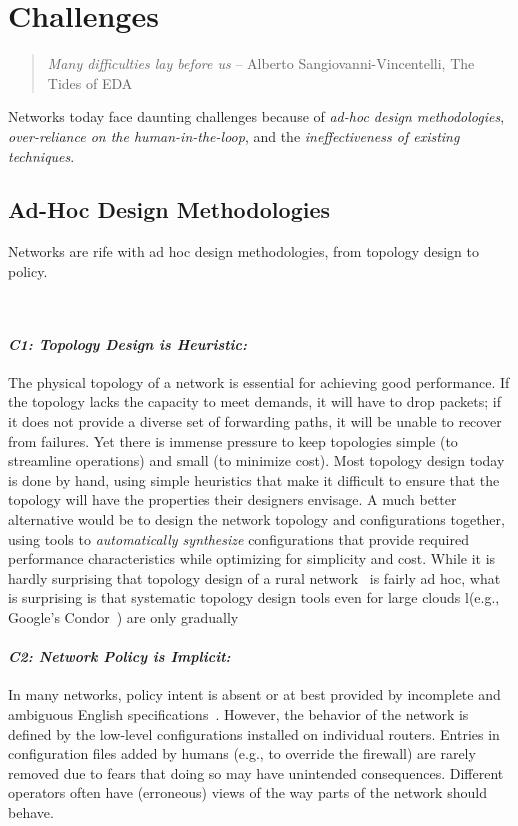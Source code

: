 \section{Challenges}
\label{sec:challenges}

\begin{quote}
{\em Many difficulties lay before us} -- Alberto
Sangiovanni-Vincentelli, The Tides of EDA~\cite{alberto}
\vspace{-2mm}
\end{quote}

Networks today face daunting challenges because of {\em ad-hoc design methodologies}, {\em over-reliance on the human-in-the-loop}, and the {\em ineffectiveness of existing techniques}.

\subsection{Ad-Hoc Design Methodologies}

Networks are rife with ad hoc design methodologies, from topology design to policy.

\
\paragraph*{\em C1: Topology Design is Heuristic:}
%
The physical topology of a network is essential for achieving good performance. If the topology lacks the capacity to meet demands, it will have to drop packets; if it does not provide a diverse set of forwarding paths, it will be unable to recover from failures.  Yet there is immense pressure to keep topologies simple (to streamline operations) and small (to minimize cost). Most topology design today is done by hand, using simple heuristics that make it difficult to ensure that the topology will have the properties their designers envisage. A much better alternative would be to design the network topology and configurations together, using tools to {\em automatically synthesize} configurations that provide required performance characteristics while optimizing for simplicity and cost. While it is 
hardly surprising that topology design of a rural network~\cite{barath} is fairly ad hoc, what is
surprising is that systematic topology design tools even for large clouds l(e.g.,  Google's 
Condor~\cite{condor}) are only gradually 

\paragraph*{\em C2: Network Policy is Implicit:}
%
In many networks, policy intent is absent or at best provided by incomplete and ambiguous English specifications~\cite{propane}. However, the behavior of the network is defined by the low-level configurations installed on individual routers. Entries in configuration files added by humans (e.g., to override the firewall) are rarely removed due to fears that doing so may have unintended consequences. Different operators often have (erroneous) views of the way parts of the network should behave.


